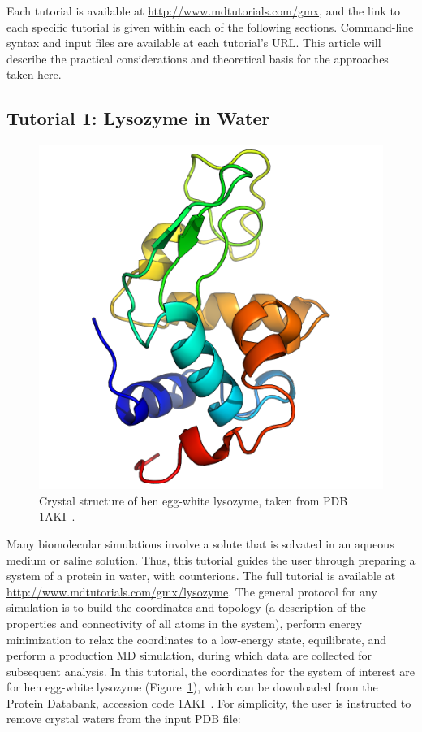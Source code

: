 \documentclass[9pt,tutorial,pubversion]{livecoms}
\newcommand{\urlstring}{http://www.mdtutorials.com/gmx}
\newcommand{\tutorialhomeurl}{\url{\urlstring}}
\newcommand{\tutoriallyso}{\url{\urlstring/lysozyme}}
\begin{document}
Each tutorial is available at \tutorialhomeurl, and the link to each specific tutorial is given within each of the following sections. Command-line syntax and input files are available at each tutorial's URL. This article will describe the practical considerations and theoretical basis for the approaches taken here.

\subsection{Tutorial 1: Lysozyme in Water} \label{lyso}

\begin{figure}[H]
\centering
\includegraphics{lysozyme_1aki}
\caption{Crystal structure of hen egg-white lysozyme, taken from PDB 1AKI~\cite{Artymiuk1982}.}
\label{lyso_xtal_fig}
\end{figure}

Many biomolecular simulations involve a solute that is solvated in an aqueous medium or saline solution. Thus, this tutorial guides the user through preparing a system of a protein in water, with counterions. The full tutorial is available at \tutoriallyso. The general protocol for any simulation is to build the coordinates and topology (a description of the properties and connectivity of all atoms in the system), perform energy minimization to relax the coordinates to a low-energy state, equilibrate, and perform a production MD simulation, during which data are collected for subsequent analysis. In this tutorial, the coordinates for the system of interest are for hen egg-white lysozyme (Figure~\ref{lyso_xtal_fig}), which can be downloaded from the Protein Databank, accession code 1AKI~\cite{Artymiuk1982}. For simplicity, the user is instructed to remove crystal waters from the input PDB file:
\end{document}
